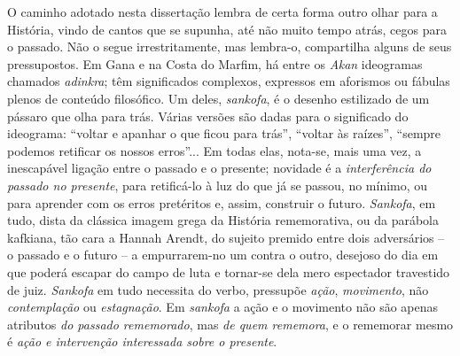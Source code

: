O caminho adotado nesta dissertação lembra de certa forma outro olhar para a História, vindo de cantos que se supunha, até não muito tempo atrás, cegos para o passado. Não o segue irrestritamente, mas lembra-o, compartilha alguns de seus pressupostos. Em Gana e na Costa do Marfim, há entre os \textit{Akan} ideogramas chamados \textit{adinkra}; têm significados complexos, expressos em aforismos ou fábulas plenos de conteúdo filosófico. Um deles, \textit{sankofa}, é o desenho estilizado de um pássaro que olha para trás. Várias versões são dadas para o significado do ideograma: ``voltar e apanhar o que ficou para trás'', ``voltar às raízes'', ``sempre podemos retificar os nossos erros''... Em todas elas, nota-se, mais uma vez, a inescapável ligação entre o passado e o presente; novidade é a \textit{interferência do passado no presente}, para retificá-lo à luz do que já se passou, no mínimo, ou para aprender com os erros pretéritos e, assim, construir o futuro. \textit{Sankofa}, em tudo, dista da clássica imagem grega da História rememorativa, ou da parábola kafkiana, tão cara a Hannah Arendt, do sujeito premido entre dois adversários -- o passado e o futuro -- a empurrarem-no um contra o outro, desejoso do dia em que poderá escapar do campo de luta e tornar-se dela mero espectador travestido de juiz. \textit{Sankofa} em tudo necessita do verbo, pressupõe \textit{ação}, \textit{movimento}, não \textit{contemplação} ou \textit{estagnação}. Em \textit{sankofa} a ação e o movimento não são apenas atributos \textit{do passado rememorado}, mas \textit{de quem rememora}, e o rememorar mesmo é \textit{ação e intervenção interessada sobre o presente}.

